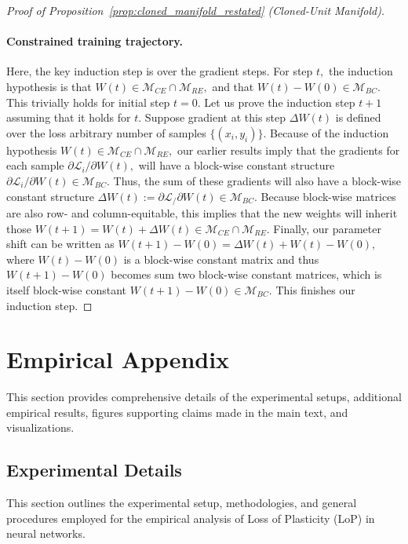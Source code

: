 \documentclass{article}
\newcommand{\Loss}{\mathcal{L}}
\newcommand{\ManifoldRE}{\mathcal{M}_{RE}}
\newcommand{\ManifoldCE}{\mathcal{M}_{CE}}
\newcommand{\ManifoldBC}{\mathcal{M}_{BC}}
\numberwithin{figure}{section}
\begin{document}
\begin{proof}[Proof of Proposition~\ref{prop:cloned_manifold_restated} (Cloned-Unit Manifold)]
\paragraph{Constrained training trajectory.} Here, the key induction step is over the gradient steps. For step $t,$ the induction hypothesis is that $W(t) \in \ManifoldCE\cap\ManifoldRE,$ and that $W(t)-W(0) \in \ManifoldBC. $ This trivially holds for initial step $t=0.$ Let us prove the induction step $t+1$ assuming that it holds for $t.$ Suppose gradient at this step $\Delta W(t)$ is defined over the loss arbitrary number of samples $\{(x_i,y_i)\}.$ Because of the induction hypothesis $W(t) \in \ManifoldCE\cap\ManifoldRE,$ our earlier results imply that the gradients for each sample $\partial \Loss_i / \partial W(t),$ will have a block-wise constant structure $\partial \Loss_i / \partial W(t) \in \ManifoldBC. $ Thus, the sum of these gradients will also have a block-wise constant structure $\Delta W(t) := \partial \Loss_ / \partial W(t) \in \ManifoldBC. $ Because block-wise matrices are also row- and column-equitable, this implies that the new weights will inherit those $W(t+1) = W(t) + \Delta W(t) \in \ManifoldCE\cap\ManifoldRE. $  Finally, our parameter shift can be written as $W(t+1)-W(0) = \Delta W(t) + W(t)-W(0), $  where $W(t)-W(0)  $ is a block-wise constant matrix and thus $W(t+1)-W(0)$ becomes sum two block-wise constant matrices, which is itself block-wise constant $W(t+1)-W(0)\in \ManifoldBC. $ This finishes our induction step. 

\end{proof}



\section{Empirical Appendix}
\label{app:empirical_evidence_appendix}
This section provides comprehensive details of the experimental setups, additional empirical results, figures supporting claims made in the main text, and visualizations.

\subsection{Experimental Details}
\label{sec:experimental_details}

This section outlines the experimental setup, methodologies, and general procedures employed for the empirical analysis of Loss of Plasticity (LoP) in neural networks.
\end{document}
